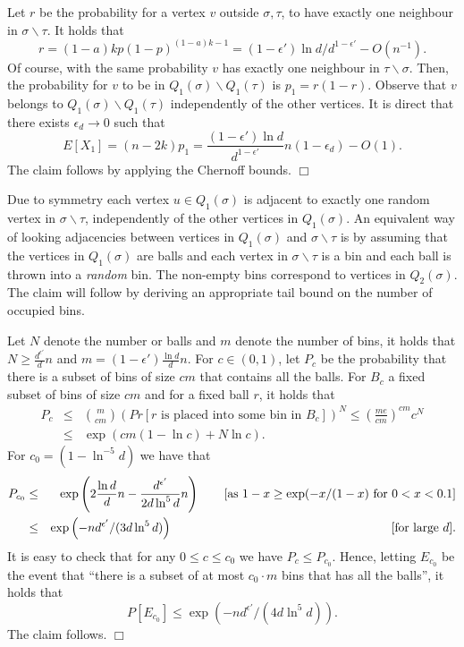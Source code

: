 \documentclass[a4paper,10pt]{article}
\makeatletter
\newenvironment{claimproof}[1]{\noindent{\bf Proof of Claim #1\@:}}{\hfill $\Box$\\}
\makeatother
\begin{document}
\begin{claimproof}{\ref{claim:Q1Claim}}
Let $r$ be the probability for a vertex $v$ outside $\sigma,\tau$,
to have exactly one neighbour in $\sigma\backslash \tau$. It holds
that 
$$r=(1-a)kp(1-p)^{(1-a)k-1}=(1-\epsilon')\ln d/d^{1-\epsilon'}-O(n^{-1}).$$
Of course, with the same probability  $v$ has exactly one neighbour
in $\tau\backslash \sigma$. Then, the probability for $v$ to be in 
$Q_1(\sigma)\backslash Q_1(\tau)$ is $p_1=r(1-r)$. Observe that $v$ belongs
to $Q_1(\sigma)\backslash Q_1(\tau)$ independently of the other vertices.
It is direct that there exists
$\epsilon_d\to 0$ such that 
\begin{displaymath}
E[X_1]=(n-2k)p_1=\frac{(1-\epsilon')\ln d }{d^{1-\epsilon'}}n\left(1-\epsilon_d\right) -O(1).
\end{displaymath}
The claim follows by applying the Chernoff bounds.
\end{claimproof}




\begin{claimproof}{\ref{claim:Q2Claim}}
Due to symmetry each vertex $u\in Q_1(\sigma)$ is adjacent to
exactly one random vertex in $\sigma\backslash \tau$, independently
of the other vertices in $Q_1(\sigma)$. An equivalent way of
looking adjacencies between vertices in $Q_1(\sigma)$ and
$\sigma\backslash \tau$ is by assuming that the vertices in
$Q_1(\sigma)$ are balls and each vertex in $\sigma\backslash
\tau$ is a bin and each ball is thrown into a {\em random} bin.
The non-empty bins correspond to vertices in $Q_2(\sigma)$. The
claim will follow by deriving an appropriate tail bound on the
number of occupied bins.

Let $N$ denote the number or balls and $m$ denote the number of
bins, it holds that $N\geq \frac{d^{\epsilon'}}{d}n$ and $m=(1-\epsilon')\frac{\ln d}{d}n$.
For $c\in (0,1)$, let $P_c$ be the probability that there is a
subset of bins of size $cm$ that contains all the balls. For $B_c$
a fixed subset of bins of size $cm$ and for a fixed ball $r$, it
holds that
\begin{eqnarray}
P_c&\leq& {m \choose cm}\left (Pr[r \textrm{ is placed into some bin in } B_c]\right)^N
\leq \left(\frac{me}{cm}\right)^{cm}c^N \nonumber \\
&\leq & \exp\left(cm(1-\ln c)+ N\ln c\right).\nonumber 
\end{eqnarray}
For $c_0=(1-\ln^{-5} d)$ we have that
\begin{eqnarray}
P_{c_0}&\leq& \exp\left( 2\frac{\ln d}{d}n -\frac{d^{\epsilon'}}{2d\ln^5 d}n \right)
\qquad \mbox{[as $1-x\geq \exp(-x/(1-x)$ for $0<x<0.1$]}\nonumber\\
&\leq & \exp\left(-nd^{\epsilon'}/(3d\ln^5 d)\right) \hspace{6.35cm} \mbox{[for large $d$]}.
\nonumber
\end{eqnarray}
It is easy to check that for any $0\leq c\leq c_0$ we have $P_c\leq
P_{c_0}$. Hence, letting $E_{c_0}$ be the event that ``there is a 
subset of at most $c_0\cdot m$ bins that has all the balls'', it
holds that
$$P[E_{c_0}]\leq \exp\left( -nd^{\epsilon'}/(4d\ln^5 d) \right).$$
The claim follows.
\end{claimproof}
\end{document}
